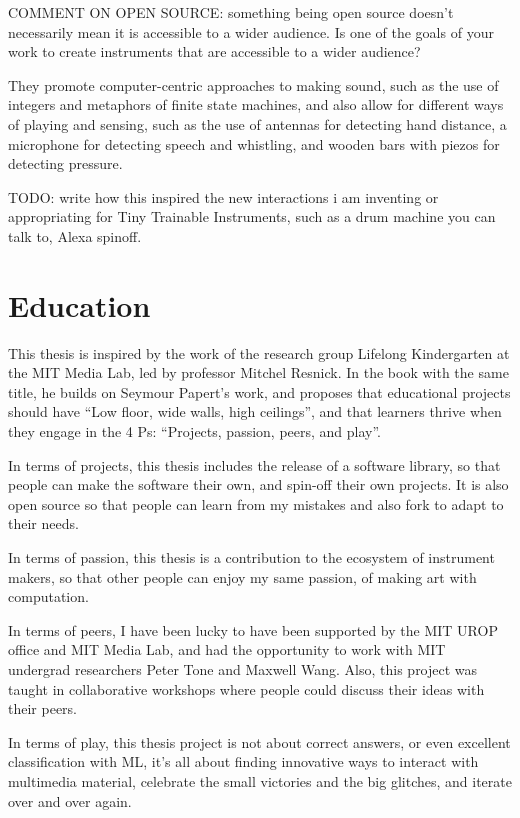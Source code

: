 COMMENT ON OPEN SOURCE: something being open source doesn't necessarily mean it is accessible to a wider audience. Is one of the goals of your work to create instruments that are accessible to a wider audience?

They promote computer-centric approaches to making sound, such as the use of integers and metaphors of finite state machines, and also allow for different ways of playing and sensing, such as the use of antennas for detecting hand distance, a microphone for detecting speech and whistling, and wooden bars with piezos for detecting pressure.

TODO: write how this inspired the new interactions i am inventing or appropriating for Tiny Trainable Instruments, such as a drum machine you can talk to, Alexa spinoff.

\section{Education}

This thesis is inspired by the work of the research group Lifelong Kindergarten at the MIT Media Lab, led by professor Mitchel Resnick. In the book with the same title, he builds on Seymour Papert’s work, and proposes that educational projects should have “Low floor, wide walls, high ceilings”, and that learners thrive when they engage in the 4 Ps: “Projects, passion, peers, and play”.

In terms of projects, this thesis includes the release of a software library, so that people can make the software their own, and spin-off their own projects. It is also open source so that people can learn from my mistakes and also \gls{fork} to adapt to their needs.

In terms of passion, this thesis is a contribution to the ecosystem of instrument makers, so that other people can enjoy my same passion, of making art with computation.

In terms of peers, I have been lucky to have been supported by the MIT UROP office and MIT Media Lab, and had the opportunity to work with MIT undergrad researchers Peter Tone and Maxwell Wang. Also, this project was taught in collaborative workshops where people could discuss their ideas with their peers.

In terms of play, this thesis project is not about correct answers, or even excellent classification with \acrshort{ML}, it's all about finding innovative ways to interact with multimedia material, celebrate the small victories and the big glitches, and iterate over and over again.

